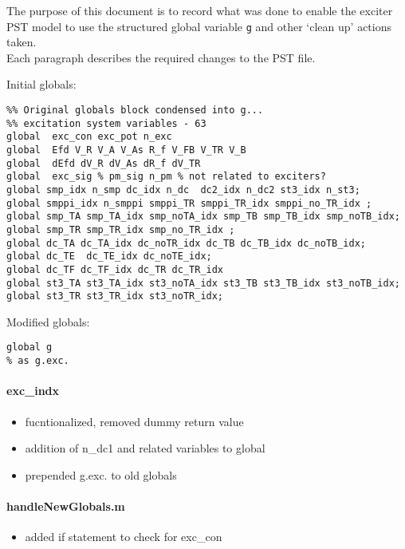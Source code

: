 \documentclass[12pt]{article}
\begin{document}
The purpose of this document is to record what was done to enable the exciter PST model to use the structured global variable \verb|g| and other `clean up' actions taken. \\
Each paragraph describes the required changes to the PST file.

Initial globals:
\begin{verbatim}
%% Original globals block condensed into g...
%% excitation system variables - 63
global  exc_con exc_pot n_exc
global  Efd V_R V_A V_As R_f V_FB V_TR V_B
global  dEfd dV_R dV_As dR_f dV_TR
global  exc_sig % pm_sig n_pm % not related to exciters?
global smp_idx n_smp dc_idx n_dc  dc2_idx n_dc2 st3_idx n_st3;
global smppi_idx n_smppi smppi_TR smppi_TR_idx smppi_no_TR_idx ;
global smp_TA smp_TA_idx smp_noTA_idx smp_TB smp_TB_idx smp_noTB_idx;
global smp_TR smp_TR_idx smp_no_TR_idx ;
global dc_TA dc_TA_idx dc_noTR_idx dc_TB dc_TB_idx dc_noTB_idx;
global dc_TE  dc_TE_idx dc_noTE_idx;
global dc_TF dc_TF_idx dc_TR dc_TR_idx
global st3_TA st3_TA_idx st3_noTA_idx st3_TB st3_TB_idx st3_noTB_idx;
global st3_TR st3_TR_idx st3_noTR_idx;
\end{verbatim}

Modified globals:
\begin{verbatim}
global g
% as g.exc.
\end{verbatim}

\paragraph{exc\_indx}
	\begin{itemize}
		\item fucntionalized, removed dummy return value
		\item addition of n\_dc1 and related variables to global
		\item prepended g.exc. to old globals
	\end{itemize}

\paragraph{handleNewGlobals.m}
	\begin{itemize}
		\item added if statement to check for exc\_con
	\end{itemize}
\end{document}
